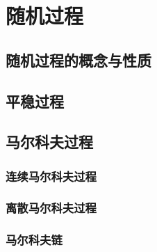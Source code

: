 \section{随机过程}

\subsection{随机过程的概念与性质}

\subsection{平稳过程}

\subsection{马尔科夫过程}

\subsubsection{连续马尔科夫过程}
\subsubsection{离散马尔科夫过程}
\subsubsection{马尔科夫链}
